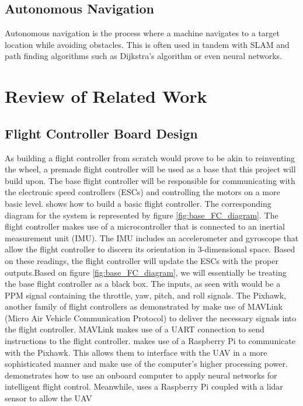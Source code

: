 \documentclass[english]{upeeei}
\begin{document}
\section{Autonomous Navigation}
Autonomous navigation is the process where a machine navigates to a target location while avoiding obstacles. This is
often used in tandem with SLAM and path finding algorithms such as Dijkstra's algorithm or even neural networks.
\cite{Dowling2018}

\chapter{Review of Related Work}
\section{Flight Controller Board Design}
As building a flight controller from scratch would prove to be akin to reinventing the wheel, a premade flight controller
will be used as a base that this project will build upon. The base flight controller will be responsible for communicating
with the electronic speed controllers (ESCs) and controlling the motors on a more basic level. \cite{MultiwiiFC} shows how
to build a basic flight controller. The corresponding diagram for the system is represented by figure
\ref{fig:base_FC_diagram}. The flight controller makes use of a microcontroller that is connected to an inertial
measurement unit (IMU). The IMU includes an accelerometer and gyroscope that allow the flight controller to discern its 
orientation in 3-dimensional space. Based on these readings, the flight controller will update the ESCs with the proper
outputs.Based on figure \ref{fig:base_FC_diagram}, we will essentially be treating the base flight controller as a black
box. The inputs, as seen with \cite{MultiwiiFC} would be a PPM signal containing the throttle, yaw, pitch, and roll signals.
The Pixhawk, another family of flight controllers as demonstrated by \cite{RPiMavlink2019} make use of MAVLink (Micro Air
Vehicle Communication Protocol) to deliver the necessary signals into the flight controller. MAVLink makes use of a UART
connection to send instructions to the flight controller. \cite{RPiMavlink2019} makes use of a Raspberry Pi to communicate
with the Pixhawk. This allows them to interface with the UAV in a more sophisticated manner and make use of the computer's
higher processing power. \cite{Redtail2017} demonstrates how to use an onboard computer to apply neural networks for
intelligent flight control. Meanwhile, \cite{Dowling2018} uses a Raspberry Pi coupled with a lidar sensor to allow the UAV
\end{document}
